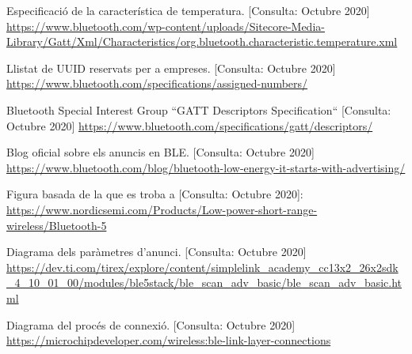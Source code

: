 \begin{thebibliography}{2}
Especificació de la característica de temperatura.
[Consulta: Octubre 2020] \newline
\href{https://www.bluetooth.com/wp-content/uploads/Sitecore-Media-Library/Gatt/Xml/Characteristics/org.bluetooth.characteristic.temperature.xml}{https://www.bluetooth.com/wp-content/uploads/Sitecore-Media-Library/Gatt/Xml/Characteristics/org.bluetooth.characteristic.temperature.xml}

Llistat de UUID reservats per a empreses.
[Consulta: Octubre 2020]\newline
\href{https://www.bluetooth.com/specifications/assigned-numbers/}{https://www.bluetooth.com/specifications/assigned-numbers/}

Bluetooth Special Interest Group
``GATT Descriptors Specification``
[Consulta: Octubre 2020]\newline
\href{https://www.bluetooth.com/specifications/gatt/descriptors/}{https://www.bluetooth.com/specifications/gatt/descriptors/}

Blog oficial sobre els anuncis en BLE. [Consulta: Octubre 2020]\newline
\href{https://www.bluetooth.com/blog/bluetooth-low-energy-it-starts-with-advertising/}{ https://www.bluetooth.com/blog/bluetooth-low-energy-it-starts-with-advertising/}

Figura basada de la que es troba a [Consulta: Octubre 2020]:\newline
\href{https://www.nordicsemi.com/Products/Low-power-short-range-wireless/Bluetooth-5}{https://www.nordicsemi.com/Products/Low-power-short-range-wireless/Bluetooth-5}

Diagrama dels paràmetres d'anunci.
[Consulta: Octubre 2020] \newline
\href{https://dev.ti.com/tirex/explore/content/simplelink\_academy\_cc13x2\_26x2sdk\_4\_10\_01\_00/modules/ble5stack/ble\_scan\_adv\_basic/ble\_scan\_adv\_basic.html}{https://dev.ti.com/tirex/explore/content/simplelink\_academy\_cc13x2\_26x2sdk\_4\_10\_01\_00/modules/ble5stack/ble\_scan\_adv\_basic/ble\_scan\_adv\_basic.html}

Diagrama del procés de connexió.
[Consulta: Octubre 2020] \newline
\href{https://microchipdeveloper.com/wireless:ble-link-layer-connections}{https://microchipdeveloper.com/wireless:ble-link-layer-connections}


\end{thebibliography}
